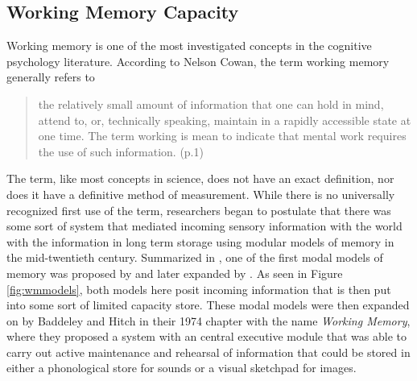 \documentclass[]{book}
\theoremstyle{definition}
\theoremstyle{definition}
\theoremstyle{definition}
\theoremstyle{remark}
\begin{document}
\hypertarget{working-memory-capacity}{%
\subsection{Working Memory Capacity}\label{working-memory-capacity}}

Working memory is one of the most investigated concepts in the cognitive
psychology literature. According to Nelson Cowan, the term working
memory generally refers to

\begin{quote}
the relatively small amount of information that one can hold in mind,
attend to, or, technically speaking, maintain in a rapidly accessible
state at one time. The term working is mean to indicate that mental work
requires the use of such information. (p.1)
\citep{cowanWorkingMemoryCapacity2005}
\end{quote}

The term, like most concepts in science, does not have an exact
definition, nor does it have a definitive method of measurement. While
there is no universally recognized first use of the term, researchers
began to postulate that there was some sort of system that mediated
incoming sensory information with the world with the information in long
term storage using modular models of memory in the mid-twentieth
century. Summarized in \citep{cowanWorkingMemoryCapacity2005}, one of
the first modal models of memory was proposed by
\citep{broadbentPerceptionCommunication1958} and later expanded by
\citep{atkinsonHUMANMEMORYPROPOSED1968}. As seen in Figure
\ref{fig:wmmodels}, both models here posit incoming information that is
then put into some sort of limited capacity store. These modal models
were then expanded on by Baddeley and Hitch
\citep{baddeleyWorkingMemory1974} in their 1974 chapter with the name
\emph{Working Memory}, where they proposed a system with an central
executive module that was able to carry out active maintenance and
rehearsal of information that could be stored in either a phonological
store for sounds or a visual sketchpad for images.
\end{document}
